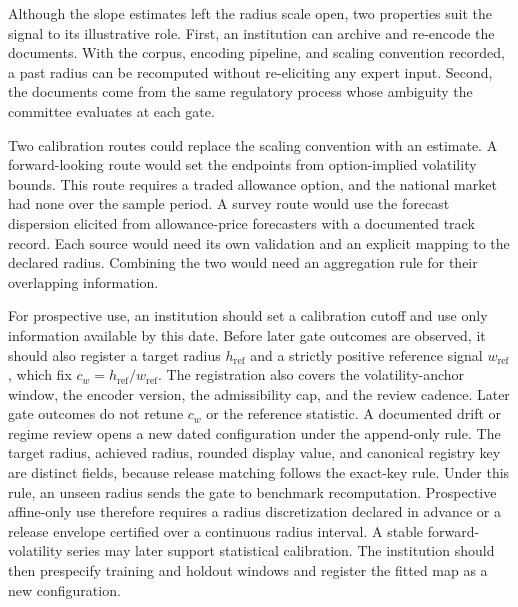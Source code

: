 Although the slope estimates left the radius scale open, two properties suit the signal to its illustrative role. First, an institution can archive and re-encode the documents. With the corpus, encoding pipeline, and scaling convention recorded, a past radius can be recomputed without re-eliciting any expert input. Second, the documents come from the same regulatory process whose ambiguity the committee evaluates at each gate.

Two calibration routes could replace the scaling convention with an estimate. A forward-looking route would set the endpoints from option-implied volatility bounds. This route requires a traded allowance option, and the national market had none over the sample period. A survey route would use the forecast dispersion elicited from allowance-price forecasters with a documented track record. Each source would need its own validation and an explicit mapping to the declared radius. Combining the two would need an aggregation rule for their overlapping information.

For prospective use, an institution should set a calibration cutoff and use only information available by this date. Before later gate outcomes are observed, it should also register a target radius $h_{\mathrm{ref}}$ and a strictly positive reference signal $w_{\mathrm{ref}}$, which fix $c_w=h_{\mathrm{ref}}/w_{\mathrm{ref}}$. The registration also covers the volatility-anchor window, the encoder version, the admissibility cap, and the review cadence. Later gate outcomes do not retune $c_w$ or the reference statistic. A documented drift or regime review opens a new dated configuration under the append-only rule. The target radius, achieved radius, rounded display value, and canonical registry key are distinct fields, because release matching follows the exact-key rule. Under this rule, an unseen radius sends the gate to benchmark recomputation. Prospective affine-only use therefore requires a radius discretization declared in advance or a release envelope certified over a continuous radius interval. A stable forward-volatility series may later support statistical calibration. The institution should then prespecify training and holdout windows and register the fitted map as a new configuration.

